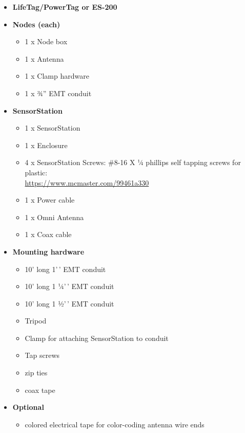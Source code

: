 \documentclass[
]{article}
\providecommand{\tightlist}{%
  \setlength{\itemsep}{0pt}\setlength{\parskip}{0pt}}
\begin{document}
\begin{itemize}
\tightlist
\item
  \textbf{LifeTag/PowerTag or ES-200}
\item
  \textbf{Nodes (each)}

  \begin{itemize}
  \tightlist
  \item
    1 x Node box
  \item
    1 x Antenna
  \item
    1 x Clamp hardware
  \item
    1 x ¾'' EMT conduit
  \end{itemize}
\item
  \textbf{SensorStation}

  \begin{itemize}
  \tightlist
  \item
    1 x SensorStation
  \item
    1 x Enclosure
  \item
    4 x SensorStation Screws: \#8-16 X ¼ phillips self tapping screws
    for plastic:\\
    \url{https://www.mcmaster.com/99461a330}
  \item
    1 x Power cable
  \item
    1 x Omni Antenna
  \item
    1 x Coax cable
  \end{itemize}
\item
  \textbf{Mounting hardware}

  \begin{itemize}
  \tightlist
  \item
    10' long 1'\,' EMT conduit
  \item
    10' long 1 ¼'\,' EMT conduit
  \item
    10' long 1 ½'\,' EMT conduit
  \item
    Tripod
  \item
    Clamp for attaching SensorStation to conduit
  \item
    Tap screws
  \item
    zip ties
  \item
    coax tape
  \end{itemize}
\item
  \textbf{Optional}

  \begin{itemize}
  \tightlist
  \item
    colored electrical tape for color-coding antenna wire ends
  \end{itemize}
\end{itemize}
\end{document}
